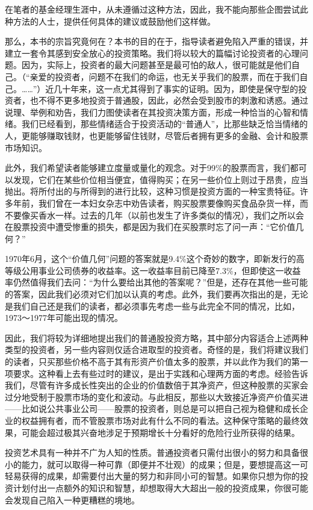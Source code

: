 \documentclass[12pt,oneside]{book}
\begin{document}
在笔者的基金经理生涯中，从未遵循过这种方法，因此，我不能向那些企图尝试此种方法的人士，提供任何具体的建议或鼓励他们这样做。

那么，本书的宗旨究竟何在？本书的目的在于，指导读者避免陷入严重的错误，并建立一套令其感到安全放心的投资策略。我们将以较大的篇幅讨论投资者的心理问题。因为，实际上，投资者的最大问题甚至是最可怕的敌人，很可能就是他们自己。（“亲爱的投资者，问题不在我们的命运，也无关乎我们的股票，而在于我们自己。……”）近几十年来，这一点尤其得到了事实的证明。因为，即使是保守型的投资者，也不得不更多地投资于普通股，因此，必然会受到股市的刺激和诱惑。通过说理、举例和劝告，我们力图使读者在其投资决策方面，形成一种恰当的心智和情绪。我们已经看到，那些情绪适合于投资活动的“普通人”，比那些缺乏恰当情绪的人，更能够赚取钱财，也更能够留住钱财，尽管后者拥有更多的金融、会计和股票市场知识。

此外，我们希望读者能够建立度量或量化的观念。对于99\%的股票而言，我们都可以发现，它们在某些价位相当便宜，值得购买；在另一些价位上则过于昂贵，应当抛出。将所付出的与所得到的进行比较，这种习惯是投资方面的一种宝贵特征。许多年前，我们曾在一本妇女杂志中劝告读者，购买股票要像购买食品杂货一样，而不要像买香水一样。过去的几年（以前也发生了许多类似的情况），我们之所以会在股票投资中遭受惨重的损失，都是因为我们在买股票时忘了问一声：“它价值几何？”

1970年6月，这个“价值几何”问题的答案就是9.4\%这个奇妙的数字，即新发行的高等级公用事业公司债券的收益率。这一收益率目前已降至7.3\%，但即使这一收益率仍然值得我们去问：“为什么要给出其他的答案呢？”但是，还存在其他一些可能的答案，因此我们必须对它们加以认真的考虑。此外，我们要再次指出的是，无论是我们自己还是我们的读者，都必须事先考虑一些与此完全不同的情况，比如，1973～1977年可能出现的情况。

因此，我们将较为详细地提出我们的普通股投资方略，其中部分内容适合上述两种类型的投资者，另一些内容则仅适合进取型的投资者。奇怪的是，我们将建议我们的读者，只买那些价格不高于其有形资产价值太多的股票，并以此作为我们的第一项要求。这种看上去有些过时的建议，是出于实践和心理两方面的考虑。经验告诉我们，尽管有许多成长性突出的企业的价值数倍于其净资产，但这种股票的买家会过分地受制于股票市场的变化和波动。与此相反，那些以大致接近净资产价值买进——比如说公共事业公司——股票的投资者，则总是可以把自己视为稳健和成长企业的权益拥有者，而不管股票市场对此有什么不同的看法。这种保守策略的最终效果，可能会超过极其兴奋地涉足于预期增长十分看好的危险行业所获得的结果。

投资艺术具有一种并不广为人知的性质。普通投资者只需付出很小的努力和具备很小的能力，就可以取得一种可靠（即便并不壮观）的成果；但是，要想提高这一可轻易获得的成果，却需要付出大量的努力和非同小可的智慧。如果你只想为你的投资计划付出一点额外的知识和智慧，却想取得大大超出一般的投资成果，你很可能会发现自己陷入一种更糟糕的境地。
\end{document}
